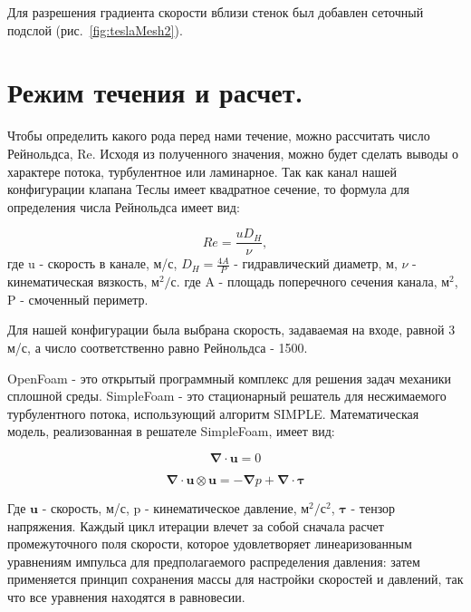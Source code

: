 \documentclass[14pt,a4paper]{article}
\begin{document}
        Для разрешения градиента скорости вблизи стенок был добавлен сеточный подслой (рис.~\ref{fig:teslaMesh2}).
        
    \section*{Режим течения и расчет.}        
        
        Чтобы определить какого рода перед нами течение, можно рассчитать число Рейнольдса, Re. Исходя из полученного значения, можно будет сделать выводы о характере потока, турбулентное или ламинарное.
        Так как канал нашей конфигурации клапана Теслы имеет квадратное сечение, то формула для определения числа Рейнольдса имеет вид:
        
        \begin{equation}\label{eqn:Re}
            Re = \frac{u D_{H}}{\nu},
        \end{equation}            
        где  u - скорость в канале, м/с, $ D_{H} = \frac{4A}{P} $ - гидравлический диаметр, м, $\nu$ - кинематическая вязкость, м$^{2}/$с. 
        где A - площадь поперечного сечения канала, м$^{2}$, P - смоченный периметр. 
        
        Для нашей конфигурации была выбрана скорость, задаваемая на входе, равной 3 м/с, а число соответственно равно Рейнольдса - 1500.
        
        OpenFoam - это открытый программный комплекс для решения задач механики сплошной среды. SimpleFoam - это стационарный решатель для несжимаемого турбулентного потока, использующий алгоритм SIMPLE. Математическая модель, реализованная в решателе SimpleFoam, имеет вид:
        
        \begin{equation}\label{eqn:simpleFoam}
            \bm{\nabla} \cdot \bm{u} = 0
        \end{equation} 
        
        \begin{equation}\label{eqn:simpleFoam2}
            \bm{\nabla} \cdot \bm{u} \otimes \bm{u} = -\bm{\nabla} p + \bm{\nabla} \cdot \bm{\tau}
        \end{equation} 
        
        Где $\bm{u}$ - скорость, м/с, p - кинематическое давление, м$^{2}/$с$^{2}$, $\bm{\tau}$ - тензор напряжения. 
        Каждый цикл итерации влечет за собой сначала расчет промежуточного поля скорости, которое удовлетворяет линеаризованным уравнениям импульса для предполагаемого распределения давления: затем применяется принцип сохранения массы для настройки скоростей и давлений, так что все уравнения находятся в равновесии.
        
\end{document}
